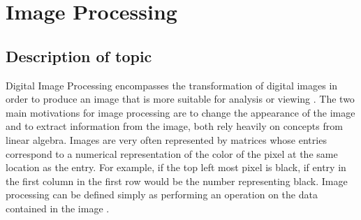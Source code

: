 \documentclass{../mathhomework}
\begin{document}
\maketitle

\pagebreak

\section{Image Processing}

\subsection{Description of topic}

Digital Image Processing encompasses the transformation of digital images in order to produce an 
image that is more suitable for analysis or viewing \cite{mcconnell03}. The two main motivations for 
image processing are to change the appearance of the image and to extract information from the image, 
both rely heavily on concepts from linear algebra. Images are very often represented by matrices whose 
entries correspond to a numerical representation of the color of the pixel at the same location as 
the entry. For example, if the top left most pixel is black, if entry in the first column in the first 
row would be the number representing black. Image processing can be defined simply as performing an 
operation on the data contained in the image \cite{gonzalez18}.
\end{document}
